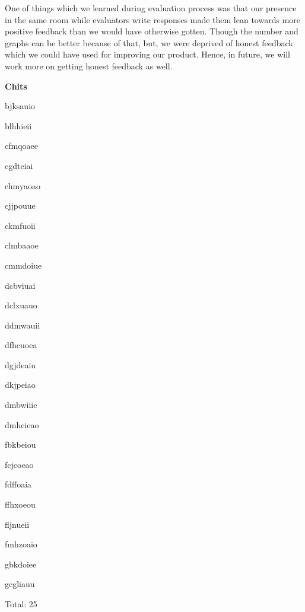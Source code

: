 \documentclass[conference]{IEEEtran}
\begin{document}
One of things which we learned during evaluation process was that our presence in the same room while evaluators write responses made them lean towards more positive feedback than we would have otherwise gotten. Though the number and graphs can be better because of that, but, we were deprived of honest feedback which we could have used for improving our product. Hence, in future, we will work more on getting honest feedback as well.  


\clearpage

\textbf{Chits}

bjksauio

blhhieii

cfmqoaee

cgdteiai

chmyaoao

cjjpouue

ckmfuoii

clmbaaoe

cmmdoiue

dcbviuai

dclxuauo

ddmwauii

dfhcuoea

dgjdeaiu

dkjpeiao

dmbwiiie

dmhcieao

fbkbeiou

fcjcoeao

fdffoaia

ffhxoeou

fljnueii

fmhzoaio

gbkdoiee

gcgliauu

Total: 25
\end{document}
